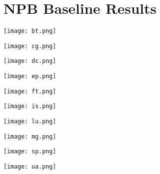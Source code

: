 \documentclass[11pt]{article}
\begin{document}
\section*{NPB Baseline Results}

\texttt{[image: bt.png]}\par\vspace{0,5cm}
\texttt{[image: cg.png]}\par\vspace{0,5cm}
\texttt{[image: dc.png]}\par\vspace{0,5cm}
\texttt{[image: ep.png]}\par\vspace{0,5cm}
\texttt{[image: ft.png]}\par\vspace{0,5cm}
\texttt{[image: is.png]}\par\vspace{0,5cm}
\texttt{[image: lu.png]}\par\vspace{0,5cm}
\texttt{[image: mg.png]}\par\vspace{0,5cm}
\texttt{[image: sp.png]}\par\vspace{0,5cm}
\texttt{[image: ua.png]}\par\vspace{0,5cm}
\end{document}
